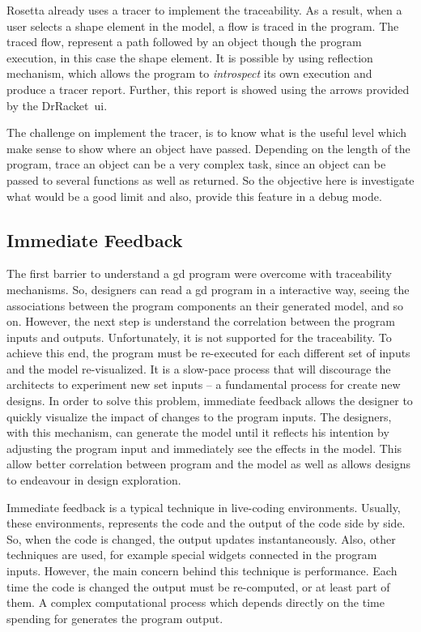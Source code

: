 Rosetta already uses a tracer to implement the traceability. As a result, when a user selects a shape element in the model, a flow is traced in the program. The traced flow, represent a path followed by an object though the program execution, in this case the shape element. It is possible by using reflection mechanism, which allows the program to \textit{introspect} its own execution and produce a tracer report. Further, this report is showed using the arrows provided by the DrRacket~\ac{ui}.  

The challenge on implement the tracer, is to know what is the useful level which make sense to show where an object have passed. Depending on the length of the program, trace an object can be a very complex task, since an object can be passed to several functions as well as returned. So the objective here is investigate what would be a good limit and also, provide this feature in a debug mode.

\subsection{Immediate Feedback}

The first barrier to understand a \ac{gd} program were overcome with traceability mechanisms. So, designers can read a \ac{gd} program in a interactive way, seeing the associations between the program components an their generated model, and so on. However, the next step is understand the correlation between the program inputs and outputs. Unfortunately, it is not supported for the traceability. To achieve this end, the program must be re-executed for each different set of inputs and the model re-visualized. It is a slow-pace process that will discourage the architects to experiment new set inputs -- a fundamental process for create new designs. In order to solve this problem, immediate feedback allows the designer to quickly visualize the impact of changes to the program inputs. The designers, with this mechanism, can generate the model until it reflects his intention by adjusting the program input and immediately see the effects in the model. This allow better correlation between program and the model as well as allows designs to endeavour in design exploration.

Immediate feedback is a typical technique in live-coding environments. Usually, these environments, represents the code and the output of the code side by side. So, when the code is changed, the output updates instantaneously. Also, other techniques are used, for example special widgets connected in the program inputs. However, the main concern behind this technique is performance. Each time the code is changed the output must be re-computed, or at least part of them. A complex computational process which depends directly on the time spending for generates the program output.

